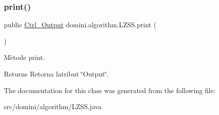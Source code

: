 \subsubsection{\texorpdfstring{print()}{print()}}
{\footnotesize\ttfamily public \hyperlink{classpersistencia_1_1output_1_1Ctrl__Output}{Ctrl\+\_\+\+Output} domini.\+algorithm.\+L\+Z\+S\+S.\+print (\begin{DoxyParamCaption}{ }\end{DoxyParamCaption})\hspace{0.3cm}{\ttfamily [inline]}}



Mètode print. 

\begin{DoxyReturn}{Returns}
Retorna l\textquotesingle{}atribut \char`\"{}\+Output\char`\"{}. 
\end{DoxyReturn}


The documentation for this class was generated from the following file\+:\begin{DoxyCompactItemize}
\item 
src/domini/algorithm/L\+Z\+S\+S.\+java\end{DoxyCompactItemize}
